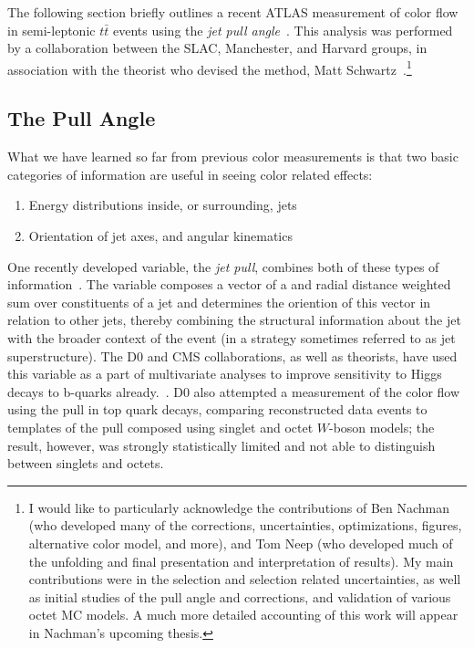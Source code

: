 The following section briefly outlines a recent ATLAS measurement of color flow in semi-leptonic $t\bar{t}$ events using the \textit{jet pull angle}~\cite{Aad:2015lxa}. This analysis was performed by a collaboration between the SLAC, Manchester, and Harvard groups, in association with the theorist who devised the method, Matt Schwartz~\cite{Gallicchio:2010sw}.\footnote{I would like to particularly acknowledge the contributions of Ben Nachman (who developed many of the corrections, uncertainties, optimizations, figures, alternative color model, and more), and Tom Neep (who developed much of the unfolding and final presentation and interpretation of results). My main contributions were in the selection and selection related uncertainties, as well as initial studies of the pull angle and corrections, and validation of various octet MC models. A much more detailed accounting of this work will appear in Nachman's upcoming thesis.}



\subsection{The Pull Angle}

What we have learned so far from previous color measurements is that two basic categories of information are useful in seeing color related effects:
%
\begin{enumerate}
\item Energy distributions inside, or surrounding, jets
\item Orientation of jet axes, and angular kinematics 
\end{enumerate}
%
One recently developed variable, the \textit{jet pull}, combines both of these types of information~\cite{Gallicchio:2010sw}. The variable composes a vector of a \pt and radial distance weighted sum over constituents of a jet and determines the oriention of this vector in relation to other jets, thereby combining the structural information about the jet with the broader context of the event (in a strategy sometimes referred to as jet superstructure). The D0 and CMS collaborations, as well as theorists, have used this variable as a part of multivariate analyses to improve sensitivity to Higgs decays to b-quarks already.~\cite{D0higgs,CMShiggspap,CMShiggspap2}. D0 also attempted a measurement of the color flow using the pull in top quark decays, comparing reconstructed data events to templates of the pull composed using singlet and octet $W$-boson models; the result, however, was strongly statistically limited and not able to distinguish between singlets and octets.

